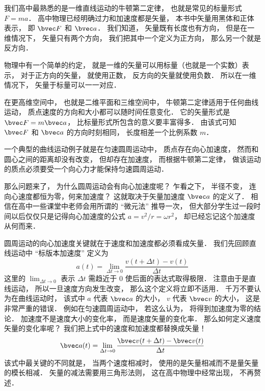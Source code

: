 
我们高中最熟悉的是一维直线运动的牛顿第二定律， 也就是常见的标量形式 $F = ma$． 高中物理已经明确过力和加速度都是矢量， 本书中矢量用黑体和正体表示， 即 $\bvec F$ 和 $\bvec a$． 我们知道， 矢量既有长度也有方向， 但是在一维情况下， 矢量只有两个方向， 我们把其中一个定义为正方向， 那么另一个就是反方向． 

物理中有一个简单的约定， 就是一维的矢量可以用标量（也就是一个实数）表示， 对于正方向的矢量， 就使用正数， 反方向的矢量就使用负数． 所以在一维情况下， 矢量于标量可以一一对应．

在更高维空间中， 也就是二维平面和三维空间中， 牛顿第二定律适用于任何曲线运动， 质点速度的方向和大小都可以随时间任意变化． 它的矢量形式是 $\bvec F = m\bvec a$， 比标量形式所包含的意义要丰富得多． 由该式可知 $\bvec F$ 和 $\bvec a$ 的方向时刻相同， 长度相差一个比例系数 $m$．

一个典型的曲线运动例子就是在匀速圆周运动中， 质点存在向心加速度， 然而和圆心之间的距离却没有改变， 但却存在加速度， 而根据牛顿第二定律， 做该运动的质点必须要受一个向心力才能保持匀速圆周运动．

那么问题来了， 为什么圆周运动会有向心加速度呢？ 乍看之下， 半径不变， 连向心速度都恒为零，何来加速度？ 这就取决于矢量加速度 $\bvec a$ 的定义了． 相信在高中一些课堂中老师会用所谓的 “微元法” 推导一次， 但大部分学生过一段时间以后仅仅只是记得向心加速度的公式 $a = v^2/r = \omega r^2$， 却已经忘记这个加速度从何而来．

圆周运动的向心加速度关键就在于速度和加速度都必须看成矢量． 我们先回顾直线运动中 “标版本加速度” 定义为
\begin{equation}
a(t) = \lim_{\Delta t\to 0}\frac{v(t+\Delta t) - v(t)}{\Delta t}
\end{equation}
这里的 $\lim_{\Delta t\to 0}$ 表示 $\Delta t$ 需趋近于 0 使后面的表达式取得极限． 注意由于是直线运动， 所以一旦速度方向发生改变， 那么这个定义将立即不适用． 千万不要认为在曲线运动时， 该式中 $a$ 代表 $\bvec a$ 的大小， $v$ 代表 $\bvec v$ 的大小， 这是非常严重的错误． 例如在匀速圆周运动中， 若这么认为， 将得到加速度为零的结论． 加速度不是速度大小的变化率， 而是速度矢量的变化率． 那么如何定义速度矢量的变化率呢？ 我们把上式中的速度和加速度都替换成矢量！
\begin{equation}
\bvec a(t) = \lim_{\Delta t\to 0}\frac{\bvec v(t+\Delta t) - \bvec v(t)}{\Delta t}
\end{equation}
该式中最关键的不同就是， 当两个速度相减时， 使用的是矢量相减而不是量矢量的模长相减． 矢量的减法需要用三角形法则， 这在高中物理中经常出现， 不再赘述．


